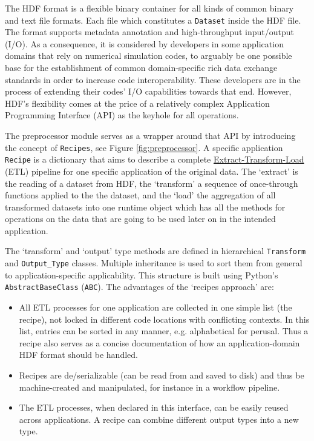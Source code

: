 The HDF format is a flexible binary container for all kinds of common binary and
text file formats. Each file which constitutes a \texttt{Dataset} inside the HDF
file. The format supports metadata annotation and high-throughput input/output
(I/O). As a consequence, it is considered by developers in some application
domains that rely on numerical simulation codes, to arguably be one possible
base for the establishment of common domain-specific rich data exchange
standards in order to increase code interoperability. These developers are in
the process of extending their codes' I/O capabilities towards that end.
However, HDF's flexibility comes at the price of a relatively complex
Application Programming Interface (API) as the keyhole for all operations.

The preprocessor module serves as a wrapper around that API by introducing the
concept of \texttt{Recipes}, see Figure \ref{fig:preprocessor}. A specific
application \texttt{Recipe} is a dictionary that aims to describe a complete
\href{https://en.wikipedia.org/wiki/Extract,_transform,_load}{Extract-Transform-Load}
(ETL) pipeline for one specific application of the original data. The `extract'
is the reading of a dataset from HDF, the `transform' a sequence of once-through
functions applied to the the dataset, and the `load' the aggregation of all
transformed datasets into one runtime object which has all the methods for
operations on the data that are going to be used later on in the intended
application.

The `transform' and `output' type methods are defined in hierarchical
\texttt{Transform} and \texttt{Output\_Type} classes. Multiple inheritance is
used to sort them from general to application-specific applicability. This
structure is built using Python's \texttt{AbstractBaseClass} (\texttt{ABC}). The
advantages of the `recipes approach' are:
\begin{itemize}
\item All ETL processes for one application are collected in one simple list
    (the recipe), not locked in different code locations with conflicting
    contexts. In this list, entries can be sorted in any manner, e.g.
    alphabetical for perusal. Thus a recipe also serves as a concise
    documentation of how an application-domain HDF format should be handled.
\item Recipes are de/serializable (can be read from and saved to disk) and thus be
    machine-created and manipulated, for instance in a workflow pipeline.
\item The ETL processes, when declared in this interface, can be easily reused
    across applications. A recipe can combine different output types into a new
    type.
\end{itemize}

